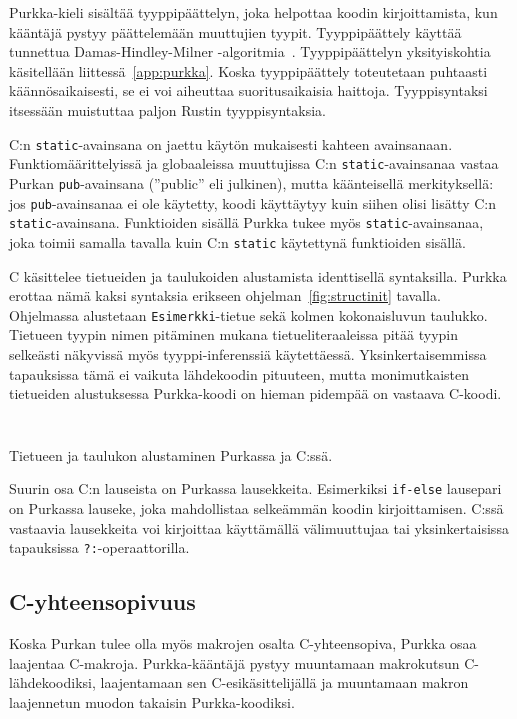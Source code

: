 Purkka-kieli sisältää tyyppipäättelyn, joka helpottaa koodin kirjoittamista,
kun kääntäjä pystyy päättelemään muuttujien tyypit. Tyyppipäättely käyttää
tunnettua Damas-Hindley-Milner -algoritmia~\citep{hindley, milner, damas}.
Tyyppipäättelyn yksityiskohtia käsitellään liittessä~\ref{app:purkka}.
Koska tyyppipäättely toteutetaan puhtaasti käännösaikaisesti, se ei voi
aiheuttaa suoritusaikaisia haittoja. Tyyppisyntaksi itsessään muistuttaa paljon
Rustin tyyppisyntaksia.

C:n \texttt{static}-avainsana on jaettu käytön mukaisesti kahteen avainsanaan.
Funktiomäärittelyissä ja globaaleissa muuttujissa C:n
\texttt{static}-avainsanaa vastaa Purkan \texttt{pub}-avainsana (''public'' eli
julkinen), mutta käänteisellä merkityksellä: jos \texttt{pub}-avainsanaa ei ole
käytetty, koodi käyttäytyy kuin siihen olisi lisätty C:n
\texttt{static}-avainsana. Funktioiden sisällä Purkka tukee myös
\texttt{static}-avainsanaa, joka toimii samalla tavalla kuin C:n
\texttt{static} käytettynä funktioiden sisällä.

C käsittelee tietueiden ja taulukoiden alustamista identtisellä syntaksilla.
Purkka erottaa nämä kaksi syntaksia erikseen ohjelman~\ref{fig:structinit}
tavalla. Ohjelmassa alustetaan \texttt{Esimerkki}-tietue sekä kolmen
kokonaisluvun taulukko. Tietueen tyypin nimen pitäminen mukana
tietueliteraaleissa pitää tyypin selkeästi näkyvissä myös tyyppi-inferenssiä
käytettäessä. Yksinkertaisemmissa tapauksissa tämä ei vaikuta lähdekoodin
pituuteen, mutta monimutkaisten tietueiden alustuksessa Purkka-koodi on
hieman pidempää on vastaava C-koodi.

\begin{listing}[ht!]
    \inputminted{Rust}{koodi/structinit.prk}
    \inputminted{C}{koodi/structinit.c}
    \caption{Tietueen ja taulukon alustaminen Purkassa ja C:ssä.}
    \label{fig:structinit}
\end{listing}

Suurin osa C:n lauseista on Purkassa lausekkeita. Esimerkiksi \texttt{if-else}
lausepari on Purkassa lauseke, joka mahdollistaa selkeämmän koodin
kirjoittamisen. C:ssä vastaavia lausekkeita voi kirjoittaa käyttämällä
välimuuttujaa tai yksinkertaisissa tapauksissa \texttt{?:}-operaattorilla.

\subsection{C-yhteensopivuus}

Koska Purkan tulee olla myös makrojen osalta C-yhteensopiva, Purkka osaa
laajentaa C-makroja. Purkka-kääntäjä pystyy muuntamaan makrokutsun
C-lähdekoodiksi, laajentamaan sen C-esikäsittelijällä ja muuntamaan makron
laajennetun muodon takaisin Purkka-koodiksi.

